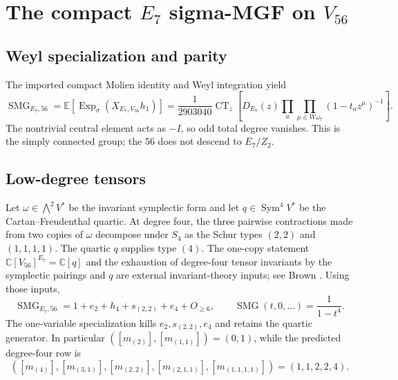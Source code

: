 \documentclass[10pt]{article}
\newcommand{\CT}{\operatorname{CT}}
\newcommand{\ExpS}{\operatorname{Exp}_{\sigma}}
\newcommand{\SMG}{\operatorname{SMG}}
\newcommand{\smgv}[2]{\mathbb E\!\left[\ExpS\!\left(X_{#1,#2}h_1\right)\right]}
\begin{document}
\clearpage
\section[The compact E7 sigma-MGF on V56]{The compact $E_7$ sigma-MGF on $V_{56}$}\label{proof:e7}
\begingroup
{}
\providecommand{\Sg}{\SMG}
\renewcommand{\Sg}{\SMG}
\providecommand{\CT}{\operatorname{CT}}
\renewcommand{\CT}{\operatorname{CT}}
\setcounter{theorem}{0}
\setcounter{proposition}{0}
\setcounter{lemma}{0}
\setcounter{corollary}{0}
\setcounter{remark}{0}
\begin{abstract}
For simply connected compact $E_7$ on its minuscule 56, we prove the
Molien--Weyl expression and parity rule, exactly verify the full quadratic
expansion with explicit torus matrices, and state the degree-four expansion
using cited invariant theory.  We also give a sparse quartic verification
algorithm; the present artifact does not report that computation as executed.
\end{abstract}

\subsection{Weyl specialization and parity}
The imported compact Molien identity and Weyl integration yield
\[
\boxed{\Sg_{E_7,56}=\smgv{E_7}{V_{56}}
=\frac1{2903040}\CT_z\!\left[D_{E_7}(z)
\prod_a\prod_{\mu\in W\omega_7}(1-t_a z^\mu)^{-1}\right].}
\]
The nontrivial central element acts as $-I$, so odd total degree vanishes.
This is the simply connected group; the 56 does not descend to $E_7/Z_2$.

\subsection{Low-degree tensors}
Let $\omega\in\bigwedge^2V^*$ be the invariant symplectic form and let
$q\in\operatorname{Sym}^4V^*$ be the Cartan--Freudenthal quartic.  At degree
four, the three pairwise contractions made from two copies of $\omega$
decompose under $S_4$ as the Schur types $(2,2)$ and $(1,1,1,1)$.  The quartic
$q$ supplies type $(4)$.  The one-copy statement
$\mathbb C[V_{56}]^{E_7}=\mathbb C[q]$ and the exhaustion of degree-four
tensor invariants by the symplectic pairings and $q$ are external
invariant-theory inputs; see Brown \cite{e7-proof-and-verification:brown}.  Using those inputs,
\[
 \boxed{\Sg_{E_7,56}=1+e_2+h_4+s_{(2,2)}+e_4+O_{\ge6}},
 \qquad \boxed{\Sg(t,0,\ldots)=\frac1{1-t^4}}.
\]
The one-variable specialization kills $e_2,s_{(2,2)},e_4$ and retains the
quartic generator.
In particular $([m_{(2)}],[m_{(1,1)}])=(0,1)$, while the predicted degree-four
row is
\[
([m_{(4)}],[m_{(3,1)}],[m_{(2,2)}],[m_{(2,1,1)}],[m_{(1,1,1,1)}])
=(1,1,2,2,4).
\]
\end{document}
